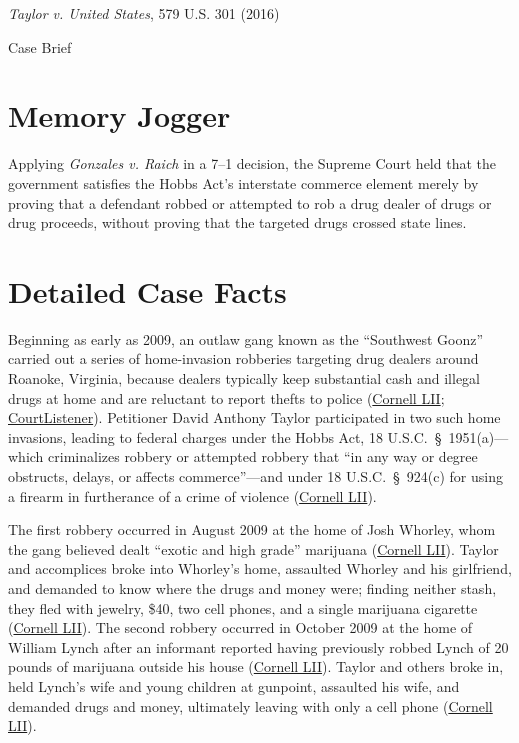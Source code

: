 \documentclass[12pt]{article}
\begin{document}
\begin{center}
{\LARGE \textit{Taylor v. United States}, 579 U.S. 301 (2016)\par}
\vspace{0.8em}
{\large Case Brief\par}
\end{center}
\vspace{1em}

\section{Memory Jogger}
Applying \textit{Gonzales v. Raich} in a 7--1 decision, the Supreme Court held that the government satisfies the Hobbs Act's interstate commerce element merely by proving that a defendant robbed or attempted to rob a drug dealer of drugs or drug proceeds, without proving that the targeted drugs crossed state lines.

\section{Detailed Case Facts}
Beginning as early as 2009, an outlaw gang known as the ``Southwest Goonz'' carried out a series of home-invasion robberies targeting drug dealers around Roanoke, Virginia, because dealers typically keep substantial cash and illegal drugs at home and are reluctant to report thefts to police (\href{https://www.law.cornell.edu/supremecourt/text/14-6166}{Cornell LII}; \href{https://www.courtlistener.com/opinion/3214883/taylor-v-united-states/}{CourtListener}). Petitioner David Anthony Taylor participated in two such home invasions, leading to federal charges under the Hobbs Act, 18 U.S.C.\ \S~1951(a)---which criminalizes robbery or attempted robbery that ``in any way or degree obstructs, delays, or affects commerce''---and under 18 U.S.C.\ \S~924(c) for using a firearm in furtherance of a crime of violence (\href{https://www.law.cornell.edu/supremecourt/text/14-6166}{Cornell LII}).

The first robbery occurred in August 2009 at the home of Josh Whorley, whom the gang believed dealt ``exotic and high grade'' marijuana (\href{https://www.law.cornell.edu/supremecourt/text/14-6166}{Cornell LII}). Taylor and accomplices broke into Whorley's home, assaulted Whorley and his girlfriend, and demanded to know where the drugs and money were; finding neither stash, they fled with jewelry, \$40, two cell phones, and a single marijuana cigarette (\href{https://www.law.cornell.edu/supremecourt/text/14-6166}{Cornell LII}). The second robbery occurred in October 2009 at the home of William Lynch after an informant reported having previously robbed Lynch of 20 pounds of marijuana outside his house (\href{https://www.law.cornell.edu/supremecourt/text/14-6166}{Cornell LII}). Taylor and others broke in, held Lynch's wife and young children at gunpoint, assaulted his wife, and demanded drugs and money, ultimately leaving with only a cell phone (\href{https://www.law.cornell.edu/supremecourt/text/14-6166}{Cornell LII}).
\end{document}
